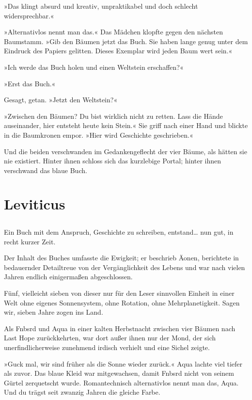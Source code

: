 »Das klingt absurd und kreativ, unpraktikabel und doch schlecht widersprechbar.«

»Alternativlos nennt man das.« Das Mädchen klopfte gegen den nächsten Baumstamm. »Gib den Bäumen jetzt das Buch. Sie haben lange genug unter dem Eindruck des Papiers gelitten. Dieses Exemplar wird jeden Baum wert sein.«

»Ich werde das Buch holen und einen Weltstein erschaffen?«

»Erst das Buch.«

Gesagt, getan. »Jetzt den Weltstein?«

»Zwischen den Bäumen? Du bist wirklich nicht zu retten. Lass die Hände auseinander, hier entsteht heute kein Stein.« Sie griff nach einer Hand und blickte in die Baumkronen empor. »Hier wird Geschichte geschrieben.«

Und die beiden verschwanden im Gedankengeflecht der vier Bäume, als hätten sie nie existiert. Hinter ihnen schloss sich das kurzlebige Portal; hinter ihnen verschwand das blaue Buch.


\part{Leviticus}

\chapter{}

Ein Buch mit dem Anspruch, Geschichte zu schreiben, entstand… nun gut, in recht kurzer Zeit.

Der Inhalt des Buches umfasste die Ewigkeit; er beschrieb Äonen, berichtete in bedauernder Detailtreue von der Vergänglichkeit des Lebens und war nach vielen Jahren endlich einigermaßen abgeschlossen.

Fünf, vielleicht sieben von dieser nur für den Leser sinnvollen Einheit in einer Welt ohne eigenes Sonnensystem, ohne Rotation, ohne Mehrplanetigkeit. Sagen wir, sieben Jahre zogen ins Land.

Als Fnbsrd und Aqua in einer kalten Herbstnacht zwischen vier Bäumen nach Last Hope zurückkehrten, war dort außer ihnen nur der Mond, der sich unerfindlicherweise zunehmend irdisch verhielt und eine Sichel zeigte.

»Guck mal, wir sind früher als die Sonne wieder zurück.« Aqua lachte viel tiefer als zuvor. Das blaue Kleid war mitgewachsen, damit Fnbsrd nicht von seinem Gürtel zerquetscht wurde. Romantechnisch alternativlos nennt man das, Aqua. Und du trägst seit zwanzig Jahren die gleiche Farbe.

